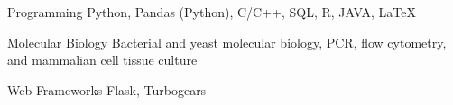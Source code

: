 

\begin{cvskills}

  \cvskill
  {Programming} %
  {Python, Pandas (Python), C/C++, SQL, R, JAVA, LaTeX} %


  \cvskill
  {Molecular Biology} %
  {Bacterial and yeast molecular biology, PCR, flow cytometry, and mammalian cell tissue culture} %

  \cvskill
  {Web Frameworks} %
  {Flask, Turbogears} %

\end{cvskills}
